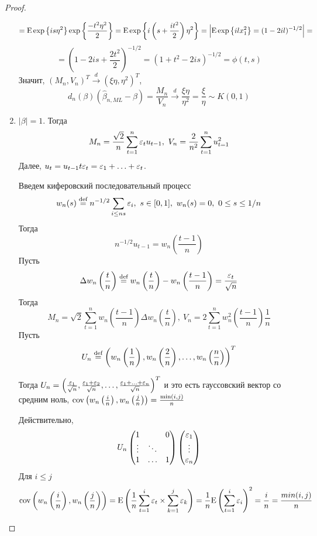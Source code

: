 \begin{proof}
\begin{enumerate}
        \[=\mathrm{E}\exp{\left\{is\eta^2\right\}}\exp{\left\{\frac{-t^2\eta^2}{2}\right\}}=\mathrm{E}\exp{\left\{i\left(s+\frac{it^2}{2}\right)\eta^2\right\}}=\Big\lvert\mathrm{E}\exp{\left\{ilx_1^2\right\}}=(1-2il)^{-1/2}\Big\rvert=\]
        \[=\left(1-2is+\frac{2t^2}{2}\right)^{-1/2}=(1+t^2-2is)^{-1/2}=\phi(t,s)\]
        Значит, $(M_n,V_n)^T\xrightarrow{d}(\xi\eta,\eta^2)^T$,
        \[d_n(\beta)(\widehat{\beta}_{n,ML}-\beta)=\frac{M_n}{V_n}\xrightarrow{d}\frac{\xi\eta}{\eta^2}=\frac{\xi}{\eta}\sim K(0,1)\]
        \item \underline{$\left\lvert \beta\right\rvert =1$}. Тогда
        \[M_n=\frac{\sqrt{2}}{n}\sum_{t=1}^n\eps_tu_{t-1},\ V_n=\frac{2}{n^2}\sum_{t=1}^nu_{t=1}^2\]
        Далее, $u_t=u_{t-1}t\varepsilon_t=\varepsilon_1+\ldots+\varepsilon_t$.

        Введем киферовский последовательный процесс
        \[w_n(s)\defeq n^{-1/2}\sum_{i\leq ns}\eps_i,\ s\in[0,1],\ w_n(s)=0,\ 0\leq s\leq 1/n\]
        Тогда 
        \[n^{-1/2}u_{t-1}=w_n\left(\frac{t-1}{n}\right)\]
        Пусть
        \[\Delta w_n\left(\frac{t}{n}\right)\stackrel{\text{def}}{=} w_n\left(\frac{t}{n}\right)-w_n\left(\frac{t-1}{n}\right)=\frac{\varepsilon_t}{\sqrt{n}}\]
        Тогда
        \[M_n=\sqrt{2}\sum_{t=1}^nw_n\left(\frac{t-1}{n}\right)\Delta w_n\left(\frac{t}{n}\right),\ V_n=2\sum_{t=1}^nw_n^2\left(\frac{t-1}{n}\right)\frac{1}{n}\]
        Пусть
        \[U_n\stackrel{\text{def}}{=} \left(w_n\left(\frac{1}{n}\right), w_n\left(\frac{2}{n}\right),\ldots,w_n\left(\frac{n}{n}\right)\right)^T\]
        \begin{leftbar}
            Тогда $U_n=\left(\frac{\varepsilon_1}{\sqrt{n}},\frac{\varepsilon_1+\varepsilon_2}{\sqrt{n}},\ldots,\frac{\varepsilon_1+\ldots+\varepsilon_n}{\sqrt{n}}\right)^T$
            и это есть гауссовский вектор со средним ноль, $\operatorname{cov}\left(w_n\left(\frac{i}{n}\right),w_n\left(\frac{j}{n}\right)\right)=\frac{\min(i,j)}{n}$
        \end{leftbar}
        Действительно,
        \[U_n\begin{pmatrix}
            1      &        & 0 \\
            \vdots & \ddots &    \\
            1      & \ldots &  1 \\
        \end{pmatrix}\begin{pmatrix}
            \varepsilon_1  \\ \vdots \\ \varepsilon_n
        \end{pmatrix}\]
        Для $i\leq j$
        \[\operatorname{cov}\left(w_n\left(\frac{i}{n}\right),w_n\left(\frac{j}{n}\right)\right)=\mathrm{E}\left(\frac{1}{n}\sum_{t=1}^i\varepsilon_t\times\sum_{k=1}^j\varepsilon_k\right)=\frac{1}{n}\mathrm{E}\left(\sum_{t=1}^i\varepsilon_i\right)^2=\frac{i}{n}=\frac{min(i,j)}{n}\]

\end{enumerate}
\end{proof}
